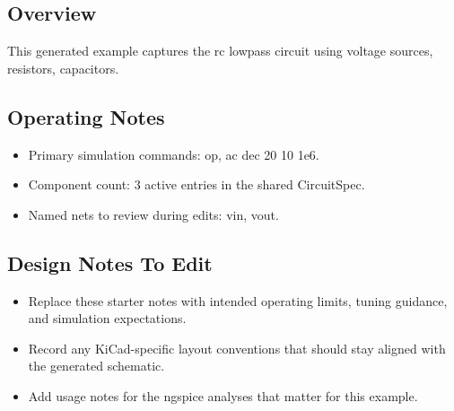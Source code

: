 \subsection*{Overview}
This generated example captures the rc lowpass circuit using voltage sources, resistors, capacitors.

\subsection*{Operating Notes}
\begin{itemize}
  \item Primary simulation commands: op, ac dec 20 10 1e6.
  \item Component count: 3 active entries in the shared CircuitSpec.
  \item Named nets to review during edits: vin, vout.
\end{itemize}
\subsection*{Design Notes To Edit}
\begin{itemize}
  \item Replace these starter notes with intended operating limits, tuning guidance, and simulation expectations.
  \item Record any KiCad-specific layout conventions that should stay aligned with the generated schematic.
  \item Add usage notes for the ngspice analyses that matter for this example.
\end{itemize}
